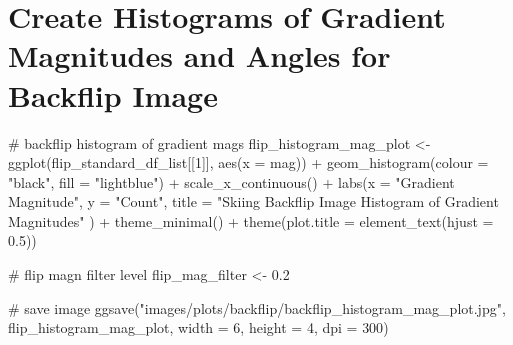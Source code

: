 \documentclass[
  letterpaper,
  DIV=11,
  numbers=noendperiod]{scrreprt}
\newenvironment{Shaded}{\begin{snugshade}}{\end{snugshade}}
\newcommand{\AttributeTok}[1]{\textcolor[rgb]{0.40,0.45,0.13}{#1}}
\newcommand{\CommentTok}[1]{\textcolor[rgb]{0.37,0.37,0.37}{#1}}
\newcommand{\DecValTok}[1]{\textcolor[rgb]{0.68,0.00,0.00}{#1}}
\newcommand{\FloatTok}[1]{\textcolor[rgb]{0.68,0.00,0.00}{#1}}
\newcommand{\FunctionTok}[1]{\textcolor[rgb]{0.28,0.35,0.67}{#1}}
\newcommand{\NormalTok}[1]{\textcolor[rgb]{0.00,0.23,0.31}{#1}}
\newcommand{\OtherTok}[1]{\textcolor[rgb]{0.00,0.23,0.31}{#1}}
\newcommand{\SpecialCharTok}[1]{\textcolor[rgb]{0.37,0.37,0.37}{#1}}
\newcommand{\StringTok}[1]{\textcolor[rgb]{0.13,0.47,0.30}{#1}}
\begin{document}
\begin{Shaded}
\end{Shaded}

\section{Create Histograms of Gradient Magnitudes and Angles for
Backflip
Image}\label{create-histograms-of-gradient-magnitudes-and-angles-for-backflip-image}

\begin{Shaded}
\begin{Highlighting}[]
\CommentTok{\# backflip histogram of gradient mags}
\NormalTok{flip\_histogram\_mag\_plot }\OtherTok{\textless{}{-}}
  \FunctionTok{ggplot}\NormalTok{(flip\_standard\_df\_list[[}\DecValTok{1}\NormalTok{]],}
         \FunctionTok{aes}\NormalTok{(}\AttributeTok{x =}\NormalTok{ mag)) }\SpecialCharTok{+}
  \FunctionTok{geom\_histogram}\NormalTok{(}\AttributeTok{colour =} \StringTok{"black"}\NormalTok{, }\AttributeTok{fill =} \StringTok{"lightblue"}\NormalTok{) }\SpecialCharTok{+}
  \FunctionTok{scale\_x\_continuous}\NormalTok{() }\SpecialCharTok{+}
  \FunctionTok{labs}\NormalTok{(}\AttributeTok{x =} \StringTok{"Gradient Magnitude"}\NormalTok{,}
       \AttributeTok{y =} \StringTok{"Count"}\NormalTok{,}
       \AttributeTok{title =} \StringTok{"Skiing Backflip Image Histogram of Gradient Magnitudes"}
\NormalTok{       ) }\SpecialCharTok{+}
  \FunctionTok{theme\_minimal}\NormalTok{() }\SpecialCharTok{+}
  \FunctionTok{theme}\NormalTok{(}\AttributeTok{plot.title =} \FunctionTok{element\_text}\NormalTok{(}\AttributeTok{hjust =} \FloatTok{0.5}\NormalTok{))}

\CommentTok{\# flip magn filter level}
\NormalTok{flip\_mag\_filter }\OtherTok{\textless{}{-}} \FloatTok{0.2}

\CommentTok{\# save image}
\FunctionTok{ggsave}\NormalTok{(}\StringTok{"images/plots/backflip/backflip\_histogram\_mag\_plot.jpg"}\NormalTok{, flip\_histogram\_mag\_plot, }\AttributeTok{width =} \DecValTok{6}\NormalTok{, }\AttributeTok{height =} \DecValTok{4}\NormalTok{, }\AttributeTok{dpi =} \DecValTok{300}\NormalTok{)}
\end{Highlighting}
\end{Shaded}
\end{document}
